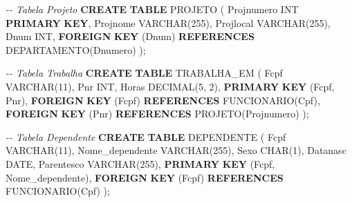\documentclass[
]{article}
\newenvironment{Shaded}{\begin{snugshade}}{\end{snugshade}}
\newcommand{\CommentTok}[1]{\textcolor[rgb]{0.56,0.35,0.01}{\textit{#1}}}
\newcommand{\DataTypeTok}[1]{\textcolor[rgb]{0.13,0.29,0.53}{#1}}
\newcommand{\DecValTok}[1]{\textcolor[rgb]{0.00,0.00,0.81}{#1}}
\newcommand{\KeywordTok}[1]{\textcolor[rgb]{0.13,0.29,0.53}{\textbf{#1}}}
\newcommand{\NormalTok}[1]{#1}
\begin{document}
\begin{Shaded}
\begin{Highlighting}[]
\CommentTok{{-}{-} Tabela Projeto}
\KeywordTok{CREATE} \KeywordTok{TABLE}\NormalTok{ PROJETO (}
\NormalTok{    Projnumero }\DataTypeTok{INT} \KeywordTok{PRIMARY} \KeywordTok{KEY}\NormalTok{,}
\NormalTok{    Projnome }\DataTypeTok{VARCHAR}\NormalTok{(}\DecValTok{255}\NormalTok{),}
\NormalTok{    Projlocal }\DataTypeTok{VARCHAR}\NormalTok{(}\DecValTok{255}\NormalTok{),}
\NormalTok{    Dnum }\DataTypeTok{INT}\NormalTok{,}
    \KeywordTok{FOREIGN} \KeywordTok{KEY}\NormalTok{ (Dnum) }\KeywordTok{REFERENCES}\NormalTok{ DEPARTAMENTO(Dnumero)}
\NormalTok{);}
\end{Highlighting}
\end{Shaded}

\begin{Shaded}
\begin{Highlighting}[]
\CommentTok{{-}{-} Tabela Trabalha}
\KeywordTok{CREATE} \KeywordTok{TABLE}\NormalTok{ TRABALHA\_EM (}
\NormalTok{    Fcpf }\DataTypeTok{VARCHAR}\NormalTok{(}\DecValTok{11}\NormalTok{),}
\NormalTok{    Pnr }\DataTypeTok{INT}\NormalTok{,}
\NormalTok{    Horas }\DataTypeTok{DECIMAL}\NormalTok{(}\DecValTok{5}\NormalTok{, }\DecValTok{2}\NormalTok{),}
    \KeywordTok{PRIMARY} \KeywordTok{KEY}\NormalTok{ (Fcpf, Pnr),}
    \KeywordTok{FOREIGN} \KeywordTok{KEY}\NormalTok{ (Fcpf) }\KeywordTok{REFERENCES}\NormalTok{ FUNCIONARIO(Cpf),}
    \KeywordTok{FOREIGN} \KeywordTok{KEY}\NormalTok{ (Pnr) }\KeywordTok{REFERENCES}\NormalTok{ PROJETO(Projnumero)}
\NormalTok{);}
\end{Highlighting}
\end{Shaded}

\begin{Shaded}
\begin{Highlighting}[]
\CommentTok{{-}{-} Tabela Dependente}
\KeywordTok{CREATE} \KeywordTok{TABLE}\NormalTok{ DEPENDENTE (}
\NormalTok{    Fcpf }\DataTypeTok{VARCHAR}\NormalTok{(}\DecValTok{11}\NormalTok{),}
\NormalTok{    Nome\_dependente }\DataTypeTok{VARCHAR}\NormalTok{(}\DecValTok{255}\NormalTok{),}
\NormalTok{    Sexo }\DataTypeTok{CHAR}\NormalTok{(}\DecValTok{1}\NormalTok{),}
\NormalTok{    Datanasc }\DataTypeTok{DATE}\NormalTok{,}
\NormalTok{    Parentesco }\DataTypeTok{VARCHAR}\NormalTok{(}\DecValTok{255}\NormalTok{),}
    \KeywordTok{PRIMARY} \KeywordTok{KEY}\NormalTok{ (Fcpf, Nome\_dependente),}
    \KeywordTok{FOREIGN} \KeywordTok{KEY}\NormalTok{ (Fcpf) }\KeywordTok{REFERENCES}\NormalTok{ FUNCIONARIO(Cpf)}
\NormalTok{);}
\end{Highlighting}
\end{Shaded}
\end{document}
